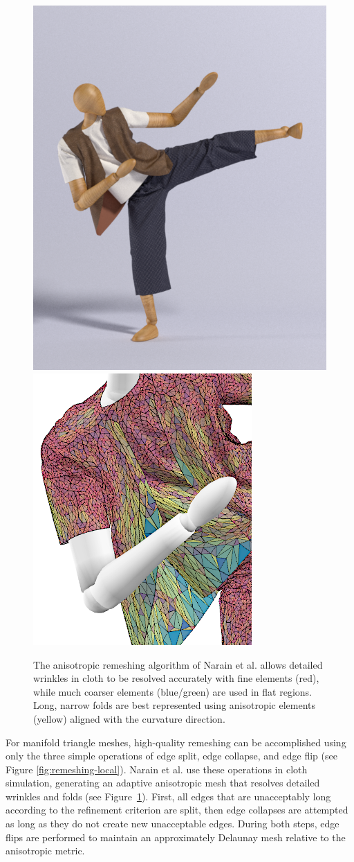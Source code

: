 \begin{figure}[t]
  \centering
  \includegraphics[width=0.48\linewidth]{images/starAdaptivity-cgf2016/cloth-render.png}
  \includegraphics[width=0.48\linewidth]{images/starAdaptivity-cgf2016/cloth-wire-zoom.png}
  \caption{The anisotropic remeshing algorithm of Narain et al. \cite{Narain2012} allows detailed wrinkles in cloth to be resolved accurately with fine elements (red), while much coarser elements (blue/green) are used in flat regions. Long, narrow folds are best represented using anisotropic elements (yellow) aligned with the curvature direction.}
  \label{fig:Narain2012}
\end{figure}

For manifold triangle meshes, high-quality remeshing can be accomplished using only the three simple operations of edge split, edge collapse, and edge flip (see Figure \ref{fig:remeshing-local}).
Narain et al. \cite{Narain2012} use these operations in cloth simulation, generating an adaptive anisotropic mesh that resolves detailed wrinkles and folds (see Figure~\ref{fig:Narain2012}).
First, all edges that are unacceptably long according to the refinement criterion are split, then edge collapses are attempted as long as they do not create new unacceptable edges.
During both steps, edge flips are performed to maintain an approximately Delaunay mesh relative to the anisotropic metric.

